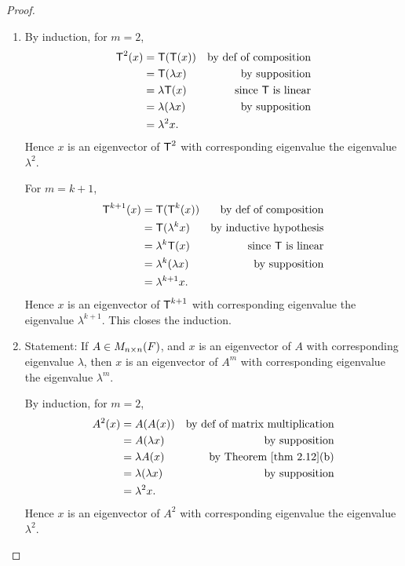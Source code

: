 \begin{proof} \ 
\begin{enumerate}
\item By induction, for \(m = 2\),
\begin{align*}
    \textsf{T}^2(x) & = \textsf{T}(\textsf{T}(x)) & \text{by def of composition} \\
            & = \textsf{T}(\lambda x) & \text{by supposition} \\
            & = \lambda \textsf{T}(x) & \text{since \(\textsf{T}\) is linear} \\
            & = \lambda (\lambda x) & \text{by supposition} \\
            & = \lambda^2 x.
\end{align*}
Hence \(x\) is an eigenvector of \(\textsf{T}^2\) with corresponding eigenvalue the eigenvalue \(\lambda^2\).

For \(m = k + 1\),
\begin{align*}
    \textsf{T}^{k + 1}(x) & = \textsf{T}(\textsf{T}^k(x)) & \text{by def of composition} \\
            & = \textsf{T}(\lambda^k x) & \text{by inductive hypothesis} \\
            & = \lambda^k \textsf{T}(x) & \text{since \(\textsf{T}\) is linear} \\
            & = \lambda^k (\lambda x) & \text{by supposition} \\
            & = \lambda^{k + 1} x.
\end{align*}
Hence \(x\) is an eigenvector of \(\textsf{T}^{k + 1}\) with corresponding eigenvalue the eigenvalue \(\lambda^{k + 1}\).
This closes the induction.

\item Statement:
If \(A \in M_{n \times n}(F)\), and \(x\) is an eigenvector of \(A\) with corresponding eigenvalue \(\lambda\),
then \(x\) is an eigenvector of \(A^m\) with corresponding eigenvalue the eigenvalue \(\lambda^m\).

By induction, for \(m = 2\),
\begin{align*}
    A^2(x) & = A(A(x)) & \text{by def of matrix multiplication} \\
            & = A(\lambda x) & \text{by supposition} \\
            & = \lambda A(x) & \text{by \THM{2.12}(b)} \\
            & = \lambda (\lambda x) & \text{by supposition} \\
            & = \lambda^2 x.
\end{align*}
Hence \(x\) is an eigenvector of \(A^2\) with corresponding eigenvalue the eigenvalue \(\lambda^2\).


\end{enumerate}
\end{proof}
